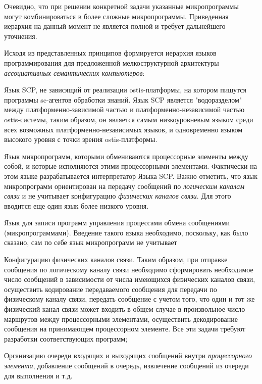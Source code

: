 Очевидно, что при решении конкретной задачи указанные микропрограммы могут комбинироваться в более сложные микропрограммы. Приведенная иерархия на данный момент не является полной и требует дальнейшего уточнения.

Исходя из представленных принципов формируется иерархия языков программирования для предложенной мелкоструктурной архитектуры \textit{ассоциативных семантических компьютеров}:
\begin{textitemize}
	\item Язык SCP, не зависящий от реализации ostis-платформы, на котором пишутся программы sc-агентов обработки знаний. Язык SCP является "водоразделом"{} между платформенно-зависимой частью и платформенно-независимой частью ostis-системы, таким образом, он является самым низкоуровневым языком среди всех возможных платформенно-независимых языков, и одновременно языком высокого уровня с точки зрения ostis-платформы. 
	\item Язык микропрограмм, которыми обмениваются процессорные элементы между собой, и которые исполняются этими процессорными элементами. Фактически на этом языке разрабатывается интерпретатор Языка SCP. Важно отметить, что язык микропрограмм ориентирован на передачу сообщений по \textit{логическим каналам связи} и не учитывает конфигурацию \textit{физических каналов связи}. Для этого вводится еще один язык более низкого уровня.
	\item Язык для записи программ управления процессами обмена сообщениями (микропрограммами). Введение такого языка необходимо, поскольку, как было сказано, сам по себе язык микропрограмм не учитывает 
	\begin{textitemize}
		\item Конфигурацию физических каналов связи. Таким образом, при отправке сообщения по логическому каналу связи необходимо сформировать необходимое число сообщений в зависимости от числа имеющихся физических каналов связи, осуществить кодирование передаваемого сообщения для передачи по физическому каналу связи, передать сообщение с учетом того, что один и тот же физический канал связи может входить в общем случае в произвольное число маршрутов между процессорными элементами, осуществить декодирование сообщения на принимающем процессорном элементе. Все эти задачи требуют разработки соответствующих программ;
		\item Организацию очереди входящих и выходящих сообщений внутри \textit{процессорного элемента}, добавление сообщений в очередь, извлечение сообщений из очереди для выполнения и т.д.
	\end{textitemize}
\end{textitemize}


